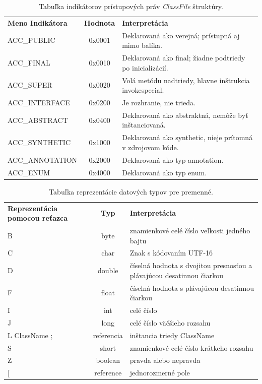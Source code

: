 \documentclass[11pt,final,oneside]{fithesis}
\begin{document}
\begin{table}
  \begin{tabular}{| l | c | p{6cm} |}
    \hline
    \textbf{Meno Indikátora} & \textbf{Hodnota} & \textbf{Interpretácia} \\
    \hhline{|=|=|=|}
    ACC\_PUBLIC & 0x0001 & Deklarovaná ako verejná; prístupná aj mimo balíka.
    \\ \hline
    ACC\_FINAL & 0x0010 & Deklarovaná ako final; žiadne podtriedy po 
    inicializácií. \\ \hline
    ACC\_SUPER & 0x0020 & Volá metódu nadtriedy, hlavne inštrukcia 
    invokespecial. \\ \hline
    ACC\_INTERFACE & 0x0200 & Je rozhranie, nie trieda.\\ \hline
    ACC\_ABSTRACT & 0x0400 & Deklarovaná ako abstraktná, nemôže byť 
    inštanciovaná. \\ \hline
    ACC\_SYNTHETIC & 0x1000 & Deklarovaná ako synthetic, nieje prítomná v 
    zdrojovom kóde. \\ \hline
    ACC\_ANNOTATION & 0x2000 & Deklarovaná ako typ annotation. \\ \hline
    ACC\_ENUM & 0x4000 & Deklarovaná ako typ enum. \\    
    \hline
  \end{tabular}
  \caption{Tabuľka indikátorov prístupových práv \textit{ClassFile} štruktúry.}
  \label{tab:tab2}
\end{table}

\begin{table}
  \begin{tabular}{| p{3cm} | c | p{} |}
    \hline
    \textbf{Reprezentácia pomocou reťazca} & \textbf{Typ} & 
    \textbf{Interpretácia} \\
    \hhline{|=|=|=|}
     B & byte &  znamienkové celé číslo veľkosti jedného bajtu \\ \hline
     C & char & Znak s kódovaním UTF-16 \\ \hline
     D & double & číselná hodnota s dvojitou presnosťou a plávajúcou
     desatinnou čiarkou \\ \hline
     F & float & číselná hodnota s plávajúcou desatinnou čiarkou \\ \hline
     I & int & celé číslo \\ \hline
     J & long & celé číslo väčšieho rozsahu \\ \hline
     L ClassName ; & referencia & inštancia triedy ClassName \\ \hline
     S & short & znamienkové celé číslo krátkeho rozsahu \\ \hline
     Z & boolean & pravda alebo nepravda \\ \hline
     [ & reference & jednorozmerné pole \\
    \hline
  \end{tabular}
  \caption{Tabuľka reprezentácie datových typov pre premenné.}
  \label{tab:tab3}
\end{table}
\end{document}

